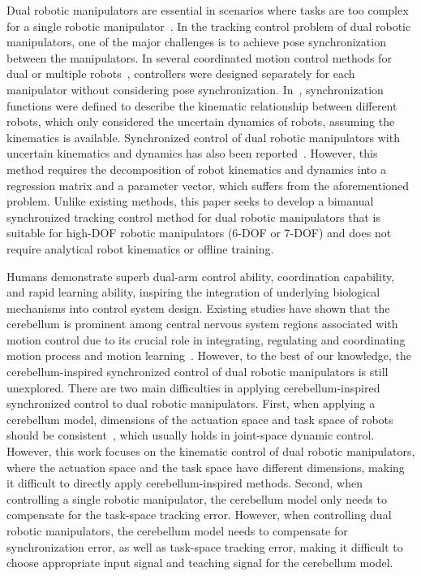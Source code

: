 \documentclass[journal,twoside,web]{ieeecolor}
\begin{document}
Dual robotic manipulators are essential in scenarios where tasks are too complex for a single robotic manipulator~\cite{Yang2017,Zhang2023,Huang2023TII}. In the tracking control problem of dual robotic manipulators, one of the major challenges is to achieve pose synchronization between the manipulators. In several coordinated motion control methods for dual or multiple robots~\cite{Zheng2024TII,Jin2018,Chen2020}, controllers were designed separately for each manipulator without considering pose synchronization. In~\cite{Sun2002}, synchronization functions were defined to describe the kinematic relationship between different robots, which only considered the uncertain dynamics of robots, assuming the kinematics is available. Synchronized control of dual robotic manipulators with uncertain kinematics and dynamics has also been reported~\cite{Zhai2022}. However, this method requires the decomposition of robot kinematics and dynamics into a regression matrix and a parameter vector, which suffers from the aforementioned problem. Unlike existing methods, this paper seeks to develop a bimanual synchronized tracking control method for dual robotic manipulators that is suitable for high-DOF robotic manipulators (6-DOF or 7-DOF) and does not require analytical robot kinematics or offline training.


Humans demonstrate superb dual-arm control ability, coordination capability, and rapid learning ability, inspiring the integration of underlying biological mechanisms into control system design. Existing studies have shown that the cerebellum is prominent among central nervous system regions associated with motion control due to its crucial role in integrating, regulating and coordinating motion process and motion learning~\cite{Yan2023TCDS,Abadia2021,Tolu2020}. However, to the best of our knowledge, the cerebellum-inspired synchronized control of dual robotic manipulators is still unexplored. There are two main difficulties in applying cerebellum-inspired synchronized control to dual robotic manipulators. First, when applying a cerebellum model, dimensions of the actuation space and task space of robots should be consistent~\cite{Tolu2020,Capolei2020,Abadia2021}, which usually holds in joint-space dynamic control. However, this work focuses on the kinematic control of dual robotic manipulators, where the actuation space and the task space have different dimensions, making it difficult to directly apply cerebellum-inspired methods. Second, when controlling a single robotic manipulator, the cerebellum model only needs to compensate for the task-space tracking error. However, when controlling dual robotic manipulators, the cerebellum model needs to compensate for synchronization error, as well as task-space tracking error, making it difficult to choose appropriate input signal and teaching signal for the cerebellum model.
\end{document}
